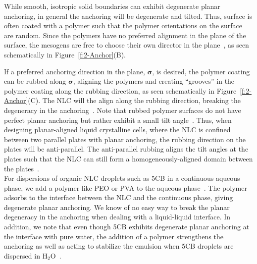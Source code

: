 While smooth, isotropic solid boundaries can exhibit degenerate planar anchoring, in general the anchoring will be degenerate and tilted.
Thus, surface is often coated with a polymer such that the polymer orientations on the surface are random.
Since the polymers have no preferred alignment in the plane of the surface, the mesogens are free to choose their own director in the plane~\cite{RN313}, as seen schematically in Figure~\ref{f:2-Anchor}(B).

If a preferred anchoring direction in the plane, $\bm{\sigma}$, is desired, the polymer coating can be rubbed along $\bm{\sigma}$, aligning the polymers and creating ``grooves'' in the polymer coating along the rubbing direction, as seen schematically in Figure~\ref{f:2-Anchor}(C).
The NLC will the align along the rubbing direction, breaking the degeneracy in the anchoring~\cite{RN33,}.
Note that rubbed polymer surfaces do not have perfect planar anchoring but rather exhibit a small tilt angle~\cite{RN232}.
Thus, when designing planar-aligned liquid crystalline cells, where the NLC is confined between two parallel plates with planar anchoring, the rubbing direction on the plates will be anti-parallel.
The anti-parallel rubbing aligns the tilt angles at the plates such that the NLC can still form a homogeneously-aligned domain between the plates~\cite{RN232}. \\

For dispersions of organic NLC droplets such as 5CB in a continuous aqueous phase, we add a polymer like PEO or PVA to the aqueous phase~\cite{RN105,RN93}.
The polymer adsorbs to the interface between the NLC and the continuous phase, giving degenerate planar anchoring.
We know of no easy way to break the planar degeneracy in the anchoring when dealing with a liquid-liquid interface.
In addition, we note that even though 5CB exhibits degenerate planar anchoring at the interface with pure water, the addition of a polymer strengthens the anchoring as well as acting to stabilize the emulsion when 5CB droplets are dispersed in H$_2$O~\cite{RN105,RN93}.\\




